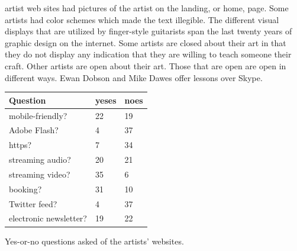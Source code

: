 \documentclass[nofonts,nobib]{tufte-handout}
\begin{document}
artist web sites had pictures of the artist on the landing, or home,
page. Some artists had color schemes which made the text
illegible. The different visual displays that are utilized by
finger-style guitarists span the last twenty years of graphic design
on the internet. Some artists are closed about their art in that they
do not display any indication that they are willing to teach someone
their craft. Other artists are open about their art. Those that are
open are open in different ways. Ewan Dobson and Mike Dawes offer
lessons over Skype.
\begin{margintable}\centering
  \small
  \begin{tabular}{p{} l l}\toprule
    Question & yeses & noes \\\midrule
    mobile-friendly? & 22 & 19\\
    Adobe Flash? & 4 & 37\\
    https? & 7 & 34\\
    streaming audio? & 20 & 21\\
    streaming video? & 35 & 6\\
    booking? & 31 & 10\\
    Twitter feed? & 4 & 37\\
    electronic newsletter? & 19 & 22\\
    \bottomrule
  \end{tabular}
  \vspace{6pt}
  \caption{Yes-or-no questions asked of the artists' websites.}
\end{margintable}
\end{document}
